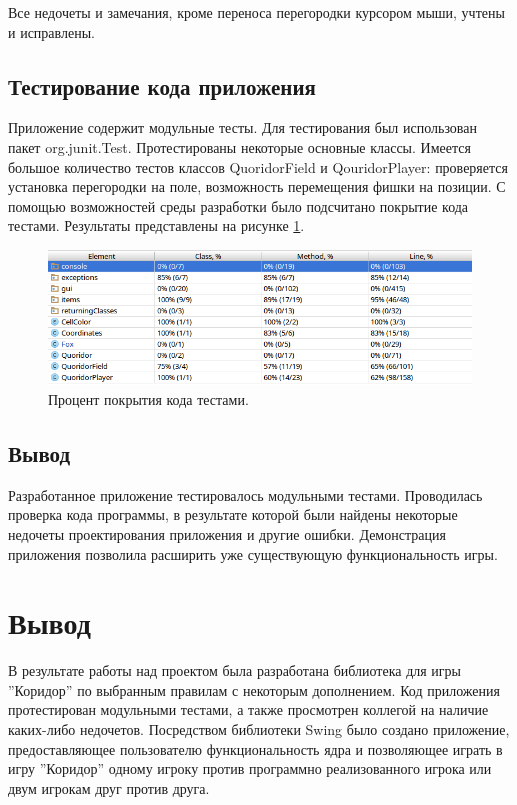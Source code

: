\documentclass[a4paper]{article}
\begin{document}
Все недочеты и замечания, кроме переноса перегородки курсором мыши, учтены и исправлены.

\subsection{Тестирование кода приложения}
Приложение содержит модульные тесты. Для тестирования был использован пакет org.junit.Test. Протестированы некоторые основные классы. Имеется большое количество тестов классов QuoridorField и QouridorPlayer: проверяется установка перегородки на поле, возможность перемещения фишки на позиции. С помощью возможностей среды разработки было подсчитано  покрытие кода тестами. Результаты представлены на рисунке \ref{pic:tests}. 

\begin{figure}[H]
	\begin{center}
		\includegraphics[scale=0.5]{tests}
		\caption{Процент покрытия кода тестами.}
		\label{pic:tests} %
	\end{center}
\end{figure}

\subsection{Вывод}
Разработанное приложение тестировалось модульными тестами. Проводилась проверка кода программы, в результате которой были найдены некоторые недочеты проектирования приложения и другие ошибки. Демонстрация приложения позволила расширить уже существующую функциональность игры. 

\section{Вывод}

В результате работы над проектом была разработана библиотека для игры ''Коридор'' по выбранным правилам с некоторым дополнением. Код приложения протестирован модульными тестами, а также просмотрен коллегой на наличие каких-либо недочетов. Посредством библиотеки Swing было создано приложение, предоставляющее пользователю функциональность ядра и позволяющее играть в игру ''Коридор'' одному игроку против программно реализованного игрока или двум игрокам друг против друга.
 
\end{document}

